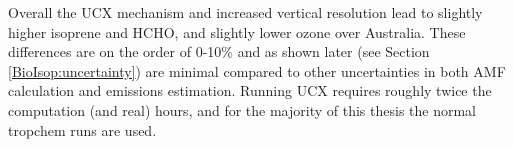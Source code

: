       
      Overall the UCX mechanism and increased vertical resolution lead to slightly higher isoprene and HCHO, and slightly lower ozone over Australia.
      These differences are on the order of 0-10\% and as shown later (see Section \ref{BioIsop:uncertainty}) are minimal compared to other uncertainties in both AMF calculation and emissions estimation.
      Running UCX requires roughly twice the computation (and real) hours, and for the majority of this thesis the normal tropchem runs are used.
      
      
      
  

